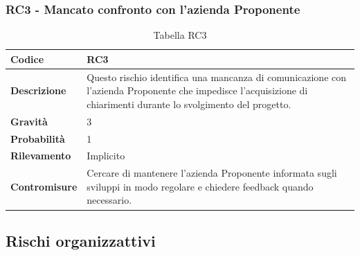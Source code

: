 \documentclass{article}
\begin{document}
    \subsubsection{RC3 - Mancato confronto con l’azienda Proponente}
    \begin{table}[H]
        \renewcommand{\arraystretch}{1.5}
        \centering
        \begin{tabular}{|p{3cm}|p{11cm}|}
            \hline
            \textbf{Codice} & RC3 \\
            \hline
            \textbf{Descrizione} & Questo rischio identifica una mancanza di comunicazione con l’azienda Proponente che impedisce l’acquisizione di chiarimenti durante lo svolgimento del progetto. \\
            \hline
            \textbf{Gravità} & 3 \\
            \hline
            \textbf{Probabilità} & 1 \\
            \hline
            \textbf{Rilevamento} & Implicito \\
            \hline
            \textbf{Contromisure} & Cercare di mantenere l’azienda Proponente informata sugli sviluppi in modo regolare e chiedere feedback quando necessario. \\
            \hline
        \end{tabular}
        \caption{Tabella RC3}
    \end{table}

    \break
    \subsection{Rischi organizzattivi}
    
\end{document}
